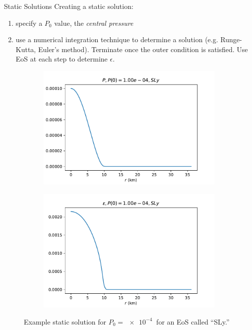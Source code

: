 \documentclass[]{beamer}
\begin{document}
    \begin{frame}{Static Solutions}
        \pause
        Creating a static solution:\pause
        \begin{enumerate}
            \item specify a $P_0$ value, the \textit{central pressure}\pause
            \item use a numerical integration technique to determine a solution \pause (e.g. Runge-Kutta, Euler's method). \pause Terminate once the outer condition is satisfied. \pause Use EoS at each step to determine $\epsilon$. \pause
        \end{enumerate}

        \begin{figure}[h!]
            \centering
            \begin{subfigure}{.5\textwidth}
                \includegraphics[width = \textwidth]{../paper/images/tov/SLy_P,p00.0001.pdf}
            \end{subfigure}%
            \begin{subfigure}{.5\textwidth}
                \includegraphics[width = \textwidth]{../paper/images/tov/SLy_rho,p00.0001.pdf}
            \end{subfigure}
            \caption[]{Example static solution for $P_0 = \SI{e-4}{}$ for an EoS called ``SLy.''}
        \end{figure}
    \end{frame}
\end{document}
